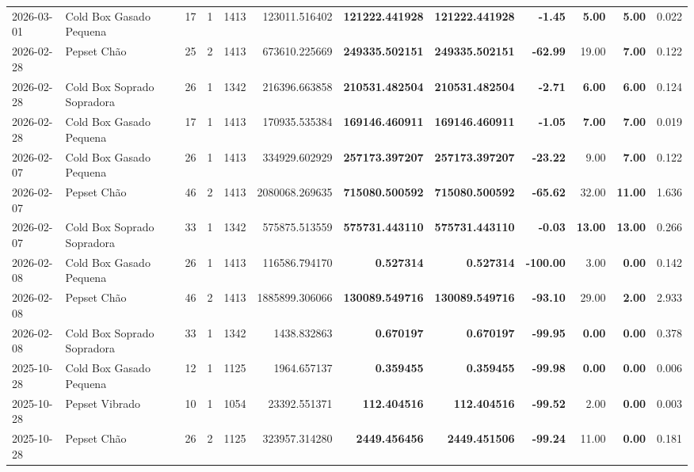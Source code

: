 {\begin{center}
{\begin{tabular}{@{}llrrrrrrrrrr@{}}
2026-03-01 & Cold Box Gasado Pequena & 17 & 1 & 1413 & 123011.516402 & \textbf{121222.441928} & \textbf{121222.441928} & \textbf{-1.45} & \textbf{5.00} & \textbf{5.00} & 0.022 \\
2026-02-28 & Pepset Chão & 25 & 2 & 1413 & 673610.225669 & \textbf{249335.502151} & \textbf{249335.502151} & \textbf{-62.99} & 19.00 & \textbf{7.00} & 0.122 \\
2026-02-28 & Cold Box Soprado Sopradora & 26 & 1 & 1342 & 216396.663858 & \textbf{210531.482504} & \textbf{210531.482504} & \textbf{-2.71} & \textbf{6.00} & \textbf{6.00} & 0.124 \\
2026-02-28 & Cold Box Gasado Pequena & 17 & 1 & 1413 & 170935.535384 & \textbf{169146.460911} & \textbf{169146.460911} & \textbf{-1.05} & \textbf{7.00} & \textbf{7.00} & 0.019 \\
2026-02-07 & Cold Box Gasado Pequena & 26 & 1 & 1413 & 334929.602929 & \textbf{257173.397207} & \textbf{257173.397207} & \textbf{-23.22} & 9.00 & \textbf{7.00} & 0.122 \\
2026-02-07 & Pepset Chão & 46 & 2 & 1413 & 2080068.269635 & \textbf{715080.500592} & \textbf{715080.500592} & \textbf{-65.62} & 32.00 & \textbf{11.00} & 1.636 \\
2026-02-07 & Cold Box Soprado Sopradora & 33 & 1 & 1342 & 575875.513559 & \textbf{575731.443110} & \textbf{575731.443110} & \textbf{-0.03} & \textbf{13.00} & \textbf{13.00} & 0.266 \\
2026-02-08 & Cold Box Gasado Pequena & 26 & 1 & 1413 & 116586.794170 & \textbf{0.527314} & \textbf{0.527314} & \textbf{-100.00} & 3.00 & \textbf{0.00} & 0.142 \\
2026-02-08 & Pepset Chão & 46 & 2 & 1413 & 1885899.306066 & \textbf{130089.549716} & \textbf{130089.549716} & \textbf{-93.10} & 29.00 & \textbf{2.00} & 2.933 \\
2026-02-08 & Cold Box Soprado Sopradora & 33 & 1 & 1342 & 1438.832863 & \textbf{0.670197} & \textbf{0.670197} & \textbf{-99.95} & \textbf{0.00} & \textbf{0.00} & 0.378 \\
2025-10-28 & Cold Box Gasado Pequena & 12 & 1 & 1125 & 1964.657137 & \textbf{0.359455} & \textbf{0.359455} & \textbf{-99.98} & \textbf{0.00} & \textbf{0.00} & 0.006 \\
2025-10-28 & Pepset Vibrado & 10 & 1 & 1054 & 23392.551371 & \textbf{112.404516} & \textbf{112.404516} & \textbf{-99.52} & 2.00 & \textbf{0.00} & 0.003 \\
2025-10-28 & Pepset Chão & 26 & 2 & 1125 & 323957.314280 & \textbf{2449.456456} & \textbf{2449.451506} & \textbf{-99.24} & 11.00 & \textbf{0.00} & 0.181 \\
\bottomrule
\end{tabular}%
}
\end{center}
}
